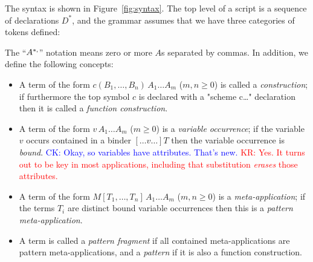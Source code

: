 \documentclass[letterpaper,11pt]{article}
\newcommand{\CK}[1]{\textcolor{blue}{CK: #1}}
\newcommand{\KR}[1]{\textcolor{red}{KR: #1}}
\begin{document}
\begin{definition}
  The \hax syntax is shown in Figure~\ref{fig:syntax}. The top level of a \hax script is a sequence
  of declarations $D^*$, and the grammar assumes that we have three categories of tokens defined:
  The ``$A^{*\kw,}$'' notation means zero or more $A$s separated by commas. In addition, we define
  the following concepts:
  \begin{itemize}

  \item A term of the form $c(B_1,…,B_n)\,A_1…A_m$ ($m,n≥0$) is called a \emph{construction}; if
    furthermore the top symbol $c$ is declared with a "scheme c…" declaration then it is called a
    \emph{function construction}.

  \item A term of the form $v\,A_1…A_m$ ($m≥0$) is a \emph{variable occurrence}; if the variable $v$
    occurs contained in a binder $[…v…]T$ then the variable occurrence is \emph{bound}.  \CK{Okay,
      so variables have attributes. That's new.} \KR{Yes. It turns out to be key in most
      applications, including that substitution \emph{erases} those attributes.}

  \item A term of the form $M[T_1,…,T_n]\,A_1…A_m$ ($m,n≥0$) is a \emph{meta-application}; if the
    terms $T_i$ are distinct bound variable occurrences then this is a \emph{pattern
      meta-application}.

  \item A term is called a \emph{pattern fragment} if all contained meta-applications are pattern
    meta-applications, and a \emph{pattern} if it is also a function construction.

  \end{itemize}
\end{definition}
\end{document}
